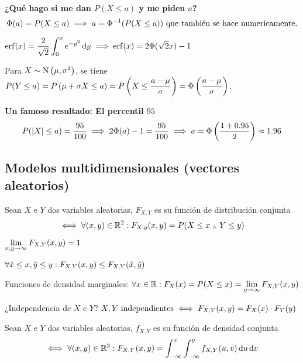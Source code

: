 \textbf{¿Qué hago si me dan $P(X \leq a)$ y me piden $a$?}
\[\Phi(a) = P(X\leq a) \implies a = \Phi^{-1}(P(X\leq a)) \text{ que también se hace numericamente.}\]

\begin{obs}
	$ \ds \operatorname{erf} (x) = \frac{2}{\sqrt{2}} \int_{0}^{x} e^{-y^2} \odif{y} \implies \operatorname{erf} (x) = 2 \Phi(\sqrt{2}x) - 1$
\end{obs}

Para $X\sim\operatorname{N}\left(\mu, \sigma^2\right)$, se tiene $\displaystyle P(Y\leq a) = P\left(\mu + \sigma X \leq a\right) = P\left(X\leq \frac{a-\mu}{\sigma}\right) = \Phi\left(\frac{a-\mu}{\sigma}\right)$.

\textbf{Un famoso resultado: El percentil $95$}
\[P(\left|X\right| \leq a) = \frac{95}{100} \implies 2\Phi(a) - 1 = \frac{95}{100} \implies a = \Phi\left(\frac{1+ 0.95}{2}\right) \approx 1.96\]

\subsection{Modelos multidimensionales (vectores aleatorios)}

\begin{defn}
	Sean $X$ e $Y$ dos variables aleatorias, $F_{X, Y}$ es su función de distribución conjunta
	\[\iff \forall (x, y) \in \mathbb{R}^2 : F_{X, y}(x, y) = P(X \leq x \; _{\wedge} \; Y \leq y)\]

\end{defn}

\begin{obs}
	\begin{itemize*}[itemjoin=\hspace{1cm}]
		\item $\displaystyle \lim_{x, y \to \infty} F_{X, Y}(x, y) = 1$
		\item $\displaystyle\forall \hat{x} \leq x, \hat{y} \leq y : F_{X, Y} (x, y) \leq F_{X, Y} (\hat{x}, \hat{y})$
	\end{itemize*}
\end{obs}

Funciones de densidad marginales: $\displaystyle \forall x \in \mathbb{R} : F_X(x) = P(X \leq x) = \lim_{y \to \infty} F_{X, Y} (x, y)$

¿Independencia de $X$ e $Y$? $\displaystyle X, Y \text{ independientes} \iff F_{X, Y}(x, y) = F_X(x) \cdot F_Y(y)$

\begin{defn}
	Sean $X$ e $Y$ dos variables aleatorias, $f_{X, Y}$ es su función de densidad conjunta
	\[\iff \forall (x, y) \in \R^2 : F_{X, Y}(x, y) = \int_{-\infty}^{x} \int_{-\infty}^{y} f_{X, Y}(u, v) \odif{u} \odif{v}\]
\end{defn}

